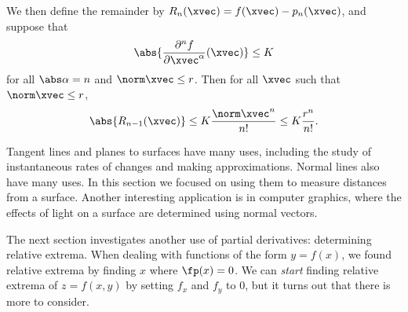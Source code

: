 We then define the remainder by $R_n(\xvec)=f(\xvec)-p_n(\xvec)$, and suppose that
\[\abs{\dfrac{\partial^n f}{\partial\xvec^\alpha}(\xvec)}\le K\]
for all $\abs\alpha=n$ and $\norm\xvec\le r$.  Then for all $\xvec$ such that $\norm\xvec\le r$,
\[\abs{R_{n-1}(\xvec)}\le K\frac{\norm\xvec^n}{n!}\le K\frac{r^n}{n!}.\]

\fi
\bigskip\bigskip

Tangent lines and planes to surfaces have many uses, including the study of instantaneous rates of changes and making approximations. Normal lines also have many uses. In this section we focused on using them to measure distances from a surface. Another interesting application is in computer graphics, where the effects of light on a surface are determined using normal vectors.\bigskip

The next section investigates another use of partial derivatives: determining relative extrema. When dealing with functions of the form $y=f(x)$, we found relative extrema  by finding $x$ where $\fp(x) = 0$. We can \textit{start} finding relative extrema of $z=f(x,y)$ by setting $f_x$ and $f_y$ to 0, but it turns out that there is more to consider.

